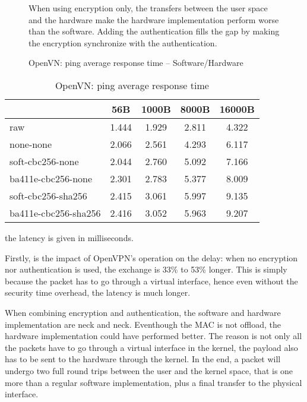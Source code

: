 \begin{figure}[ht]

\caption{OpenVN: ping average response time -- Software/Hardware}{When using encryption only, the transfers between the user space and the hardware make the hardware implementation perform worse than the software. Adding the authentication fills the gap by making the encryption synchronize with the authentication.}
\label{fig:ping-benchmark-openvpn}
\end{figure}

\begin{table}[ht]
\center
\small
\begin{tabular}{l|c|c|c|c|} \cline{2-5}
 & 56B & 1000B & 8000B & 16000B \\ \hline
\multicolumn{1}{|l|}{raw} & 1.444 & 1.929 & 2.811 & 4.322 \\ \hline
\multicolumn{1}{|l|}{none-none} & 2.066 & 2.561 & 4.293 & 6.117 \\ \hline
\multicolumn{1}{|l|}{soft-cbc256-none} & 2.044 & 2.760 & 5.092 & 7.166\\ \hline
\multicolumn{1}{|l|}{ba411e-cbc256-none} & 2.301 & 2.783 & 5.377 & 8.009\\ \hline
\multicolumn{1}{|l|}{soft-cbc256-sha256} & 2.415 & 3.061 & 5.997 & 9.135 \\ \hline
\multicolumn{1}{|l|}{ba411e-cbc256-sha256} & 2.416 & 3.052 & 5.963 & 9.207 \\ \hline
\end{tabular}
\caption{OpenVN: ping average response time}{the latency is given in milliseconds.}
\label{tab:ping-benchmark-openvpn}
\end{table}

Firstly, is the impact of OpenVPN's operation on the delay: when no encryption nor authentication is used, the exchange is 33\% to 53\% longer. This is simply because the packet has to go through a virtual interface, hence even without the security time overhead, the latency is much longer.

When combining encryption and authentication, the software and hardware implementation are neck and neck.
Eventhough the MAC is not offload, the hardware implementation could have performed better.
The reason is not only all the packets have to go through a virtual interface in the kernel, the payload also has to be sent to the hardware through the kernel.
In the end, a packet will undergo two full round trips between the user and the kernel space, that is one more than a regular software implementation, plus a final transfer to the physical interface.

